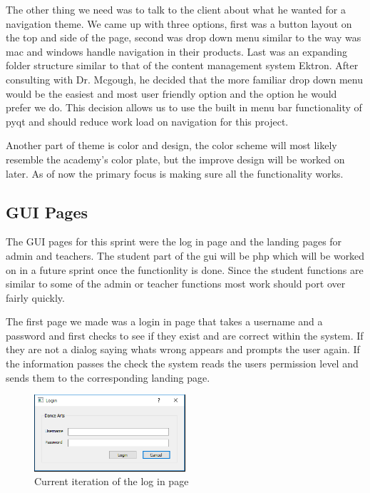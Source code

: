 \documentclass[11pt]{book}
\begin{document}
The other thing we need was to talk to the client about what he wanted for a navigation theme. We came up with three options, first was a button layout on the top and side of the page, second was  drop down menu similar to the way was mac and windows handle navigation in their products. Last was an expanding folder structure similar to that of the content management system Ektron. After consulting with Dr. Mcgough, he  decided that the more familiar drop down menu would be the easiest and most user friendly option and the option he would prefer we do. This decision allows us to use the built in menu bar functionality of pyqt and should reduce work load on navigation for this project.

Another part of theme is color and design, the color scheme will most likely resemble the academy's color plate, but the improve design will be worked on later. As of now the primary focus is making sure all the functionality works.


\subsection{GUI Pages}

The GUI pages for this sprint were the log in page and the landing pages for admin and teachers. The student part of the gui will be php which will be worked on in a future sprint once the functionlity is done. Since the student functions are similar to some of the admin or teacher functions most work should port over fairly quickly.

The first page we made was a login in page that takes a username and a password and first checks to see if they exist and are correct within the system. If they are not a dialog saying whats wrong appears and prompts the user again. If the information passes the check the system reads the users permission level and sends them to the corresponding landing page.

\begin{figure}
\caption{Current iteration of the log in page}
\centering
\includegraphics[width=0.5\textwidth]{login_page}
\end{figure}
\end{document}
